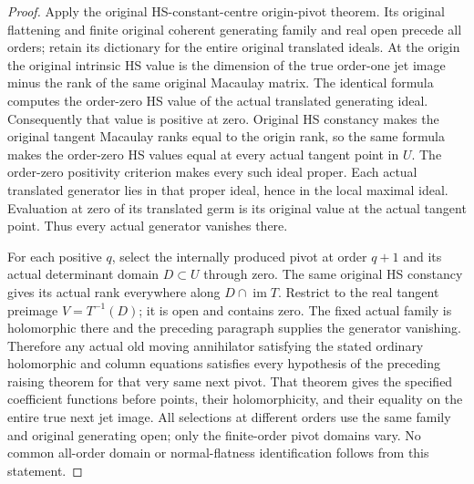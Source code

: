 \begin{proof}
Apply the original HS-constant-centre origin-pivot theorem. Its original
flattening and finite original coherent generating family and real open
precede all orders; retain its dictionary for the entire original
translated ideals. At the origin the original intrinsic HS value is
the dimension of the true order-one jet image minus the rank of the
same original Macaulay matrix. The identical formula computes the
order-zero HS value of the actual translated generating ideal.
Consequently that value is positive at zero. Original HS constancy
makes the original tangent Macaulay ranks equal to the origin rank,
so the same formula makes the order-zero HS values equal at every
actual tangent point in $U$. The order-zero positivity criterion makes
every such ideal proper. Each actual translated generator lies in
that proper ideal, hence in the local maximal ideal. Evaluation at
zero of its translated germ is its original value at the actual tangent
point. Thus every actual generator vanishes there.

For each positive $q$, select the internally produced pivot at order
$q+1$ and its actual determinant domain $D\subset U$ through zero.
The same original HS constancy gives its actual rank everywhere along
$D\cap\operatorname{im}T$. Restrict to the real tangent preimage
$V=T^{-1}(D)$; it is open and contains zero. The fixed actual family is
holomorphic there and the preceding paragraph supplies the generator
vanishing. Therefore any actual old moving annihilator satisfying the
stated ordinary holomorphic and column equations satisfies every
hypothesis of the preceding raising theorem for that very same next
pivot. That theorem gives the specified coefficient functions before
points, their holomorphicity, and their equality on the entire true
next jet image. All selections at different orders use the same family
and original generating open; only the finite-order pivot domains vary.
No common all-order domain or normal-flatness identification follows
from this statement.
\end{proof}
